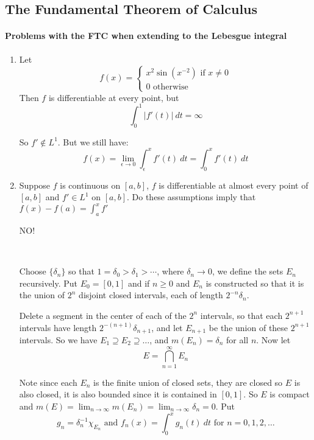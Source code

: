     \subsection{The Fundamental Theorem of Calculus}
    \paragraph*{Problems with the FTC when extending to the Lebesgue integral}
    \begin{enumerate}[label = (\alph*)]
        \item Let \[
            f(x) = \begin{cases}
                x^2\sin(x^{-2}) \text{ if }x\neq 0\\
                0 \text{ otherwise}
            \end{cases}    
        \]
        Then $f$ is differentiable at every point, but\[
            \int_0^1 |f'(t)|~dt =\infty    
        \]

        So $f'\not\in L^1$. But we still have:\[
            f(x) = \lim_{\epsilon\rightarrow 0}\int_\epsilon^x f'(t)~dt = \int_0^x f'(t)~dt    
        \]

        \item Suppose $f$ is continuous on $[a,b]$, $f$ is differentiable at almost every point of $[a,b]$ and $f'\in L^1$ on $[a,b]$. Do these assumptions imply that $f(x) - f(a) = \int_a^x f'$
        
        \textsc{NO!}

        \

        Choose $\{\delta_n\}$ so that $1 = \delta_0>\delta_1>\cdots$, where $\delta_n\rightarrow 0$, we define the sets $E_n$ recursively. Put $E_0 = [0,1]$ and if $n\geq 0$ and $E_n$ is constructed so that it is the union of $2^n$ disjoint closed intervals, each of length $2^{-n}\delta_n$. 
        
        Delete a segment in the center of each of the $2^n$ intervals, so that each $2^{n+1}$ intervals have length $2^{-(n+1)}\delta_{n+1}$, and let $E_{n+1}$ be the union of these $2^{n+1}$ intervals. So we have $E_1\supseteq E_2\supseteq \ldots$, and $m(E_n) = \delta_n$ for all $n$. Now let\[
            E = \bigcap_{n=1}^\infty E_n    
        \]

        Note since each $E_n$ is the finite union of closed sets, they are closed so $E$ is also closed, it is also bounded since it is contained in $[0,1]$. So $E$ is compact and $m(E) = \lim_{n\rightarrow \infty}m(E_n) = \lim_{n\rightarrow \infty}\delta_n = 0$. Put \[
            g_n = \delta_n^{-1}\chi_{E_n} \text{ and } f_n(x) = \int_0^x g_n(t)~dt \text{ for }n=0,1,2,\ldots    
        \]


\end{enumerate}
